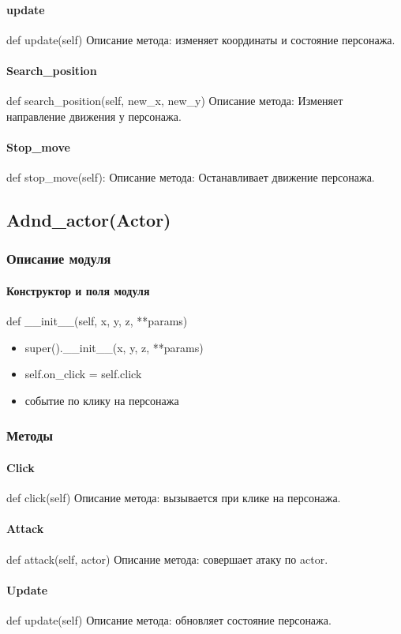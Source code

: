 \paragraph{update}
def update(self)
Описание метода: изменяет координаты и состояние персонажа.
\paragraph{Search\_position}
def search\_position(self, new\_x, new\_y)
Описание метода:  Изменяет направление движения у персонажа.
\paragraph{Stop\_move}
def stop\_move(self):
Описание метода: Останавливает движение персонажа.

\subsection{Adnd\_actor(Actor)}
\subsubsection{Описание модуля}
\paragraph{Конструктор и поля модуля}
def \_\_init\_\_(self, x, y, z, **params)
\begin{itemize}
	\item super().\_\_init\_\_(x, y, z, **params)
	\item self.on\_click = self.click
	\item событие по клику на персонажа
\end{itemize}
\subsubsection{Методы}
\paragraph{Click}
def click(self)
Описание метода: вызывается при клике на персонажа.
\paragraph{Attack}
def attack(self, actor)
Описание метода: совершает атаку по actor.
\paragraph{Update}
def update(self)
Описание метода: обновляет состояние персонажа.

